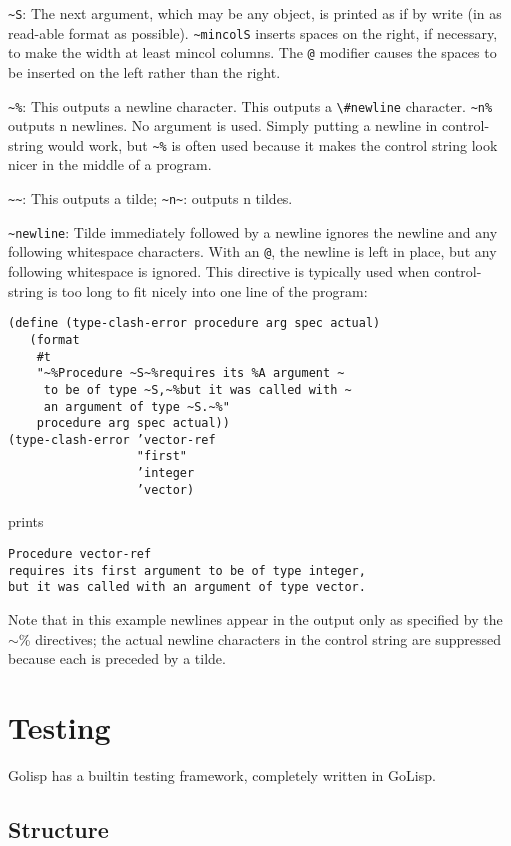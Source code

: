 \documentclass{article}
\begin{document}
\verb|~S|: The next argument, which may be any object, is printed as if by write (in
as read-able format as possible). \verb|~mincolS| inserts spaces on the
right, if necessary, to make the width at least mincol columns. The \verb|@| modifier causes
the spaces to be inserted on the left rather than the right.

\verb|~%|: This outputs a newline character. This outputs a
\verb|\#newline| character. \verb|~n%| outputs n newlines. No
argument is used. Simply putting a newline in control-string would work, but
\verb|~%| is often used because it makes the control string look nicer in
the middle of a program.

\verb|~~|: This outputs a tilde; \verb|~n~|: outputs n tildes.

\verb|~newline|: Tilde immediately followed by a newline ignores the newline and any
following whitespace characters. With an \verb|@|, the newline is left in place, but any
following whitespace is ignored. This directive is typically used when control-string is too
long to fit nicely into one line of the program:

\begin{verbatim}
(define (type-clash-error procedure arg spec actual)
   (format
    #t
    "~%Procedure ~S~%requires its %A argument ~
     to be of type ~S,~%but it was called with ~
     an argument of type ~S.~%"
    procedure arg spec actual))
(type-clash-error ’vector-ref
                  "first"
                  ’integer
                  ’vector)
\end{verbatim}

prints

\begin{verbatim}
Procedure vector-ref
requires its first argument to be of type integer,
but it was called with an argument of type vector.
\end{verbatim}

Note that in this example newlines appear in the output only as specified by the
\ensuremath{\sim}\% directives; the actual newline characters in the control string are
suppressed because each is preceded by a tilde.

\section{Testing}\label{sec:testing}

Golisp has a builtin testing framework, completely written in GoLisp.

\subsection{Structure}\label{sec:structure}
\end{document}
